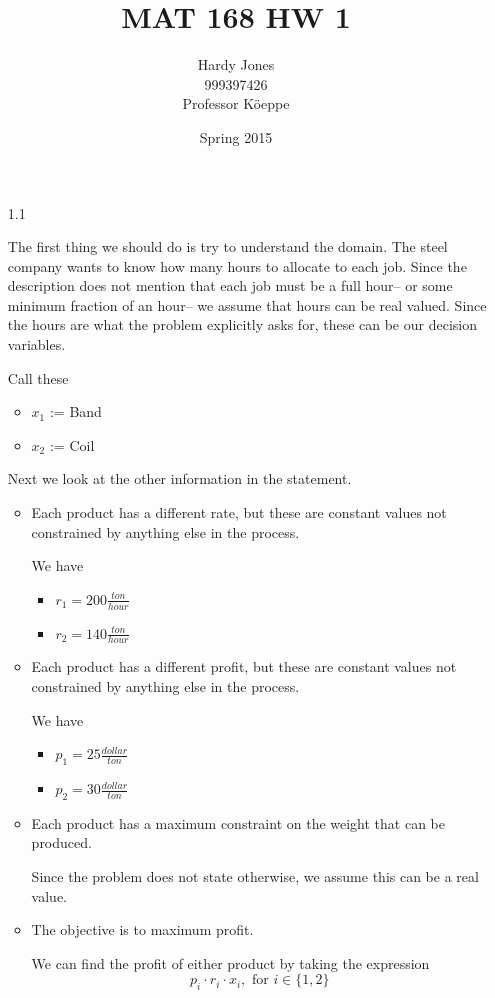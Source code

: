 \documentclass[12pt,letterpaper]{article}
\title{MAT 168 HW 1\vspace{-2ex}}
\author{Hardy Jones\\
        999397426\\
        Professor K\"{o}eppe\vspace{-2ex}}
\date{Spring 2015}
\newcommand*\constant[1]{
  Each product has a different #1,
  but these are constant values not constrained by anything else in the process.
}
\newcommand*\genericconstraint[2]{
  Each product has a #1 constraint on #2.
}
\newcommand*\maximumconstraint[1]{
  \genericconstraint{maximum}{#1}
}
\newcommand*\genericobjective[2]{
  The objective is to #1 #2.
}
\newcommand*\maximumobjective[1]{
  \genericobjective{maximum}{#1}
}
\begin{document}
  \maketitle

  \begin{enumerate}
    \item [1.1]

      The first thing we should do is try to understand the domain.
      The steel company wants to know how many hours to allocate to each job.
      Since the description does not mention that each job must be a full hour--%
      or some minimum fraction of an hour--%
      we assume that hours can be real valued.
      Since the hours are what the problem explicitly asks for,
      these can be our decision variables.

      Call these
      \begin{itemize}
        \item $x_1$ := Band
        \item $x_2$ := Coil
      \end{itemize}

      Next we look at the other information in the statement.
      \begin{itemize}
        \item
          \constant{rate}

          We have
          \begin{itemize}
            \item $r_1 = 200 \frac{ton}{hour}$
            \item $r_2 = 140 \frac{ton}{hour}$
          \end{itemize}

        \item
          \constant{profit}

          We have
          \begin{itemize}
            \item $p_1 = 25 \frac{dollar}{ton}$
            \item $p_2 = 30 \frac{dollar}{ton}$
          \end{itemize}
        \item
          \maximumconstraint{the weight that can be produced}
          Since the problem does not state otherwise,
          we assume this can be a real value.
        \item
          \maximumobjective{profit}

          We can find the profit of either product by taking the expression
          \[
            p_i \cdot r_i \cdot x_i, \text{ for } i \in \{1, 2\}
          \]
      \end{itemize}


\end{enumerate}
\end{document}
